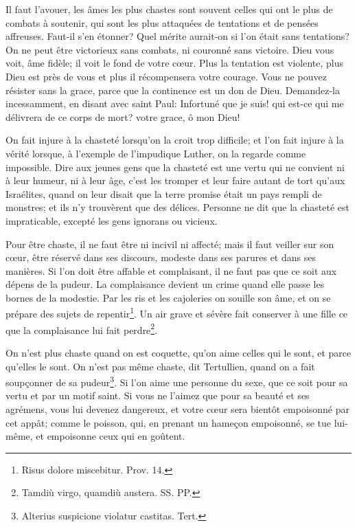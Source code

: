 \documentclass[instructions.tex]{subfiles}
\begin{document}
Il faut l'avouer, les âmes les plus chastes sont souvent celles qui ont le plus de combats à soutenir, qui sont les plus attaquées de tentations et de pensées affreuses. Faut-il s'en étonner? Quel mérite aurait-on si l'on était sans tentations? On ne peut être victorieux sans combats, ni couronné sans victoire. Dieu vous voit, âme fidèle; il voit le fond de votre cœur. Plus la tentation est violente, plus Dieu est près de vous et plus il récompensera votre courage. Vous ne pouvez résister sans la grace, parce que la continence est un don de Dieu. Demandez-la incessamment, en disant avec saint Paul: Infortuné que je suis! qui est-ce qui me délivrera de ce corps de mort? votre grace, ô mon Dieu!
 
\tertio On fait injure à la chasteté lorsqu'on la croit trop difficile; et l'on fait injure à la vérité lorsque, à l'exemple de l'impudique Luther, on la regarde comme impossible. Dire aux jeunes gens que la chasteté est une vertu qui ne convient ni à leur humeur, ni à leur âge, c'est les tromper et leur faire autant de tort qu'aux Israélites, quand on leur disait que la terre promise était un pays rempli de monstres; et ils n'y trouvèrent que des délices. Personne ne dit que la chasteté est impraticable, excepté les gens ignorans ou vicieux.
 
Pour être chaste, il ne faut être ni incivil ni affecté; mais il faut veiller sur son cœur, être réservé dans ses discours, modeste dans ses parures et dans ses manières. Si l'on doit être affable et complaisant, il ne faut pas que ce soit aux dépens de la pudeur. La complaisance devient un crime quand elle passe les bornes de la modestie. Par les ris et les cajoleries on souille son âme, et on se prépare des sujets de repentir\footnote{Risus dolore miscebitur. Prov. 14.}. Un air grave et sévère fait conserver à une fille ce que la complaisance lui fait perdre\footnote{Tamdiù virgo, quamdiù austera. SS. PP.}.
 
On n'est plus chaste quand on est coquette, qu'on aime celles qui le sont, et parce qu'elles le sont. On n'est pas même chaste, dit Tertullien, quand on a fait soupçonner de sa pudeur\footnote{Alterius suspicione violatur castitas. Tert.}. Si l'on aime une personne du sexe, que ce soit pour sa vertu et par un motif saint. Si vous ne l'aimez que pour sa beauté et ses agrémens, vous lui devenez dangereux, et votre cœur sera bientôt empoisonné par cet appât; comme le poisson, qui, en prenant un hameçon empoisonné, se tue lui-même, et empoisonne ceux qui en goûtent.
 
\end{document}
